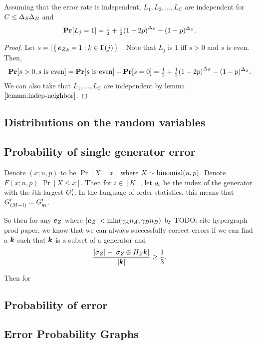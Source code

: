 \begin{lemma}{
	Assuming that the error rate is independent,
	$L_1, L_2, ..., L_C$ are independent for $C \leq {\Delta_{S}} {\Delta_{B}}$ and
	$$
		\Pr[L_j = 1] = \PrL.
	$$
}
\begin{proof}
	Let $s = |\set{{\boldsymbol{e}_Z}_k = 1 : k \in \Gamma(j)}|$.
	Note that $L_j$ is $1$ iff $s > 0$ and $s$ is even.
	Then,
	$$
		\Pr[s > 0, s \text{ is even}] = \Pr[s\text{ is even}] - \Pr[s = 0] = \PrL.
	$$
	We can also take that $L_1, ..., L_C$ are independent by lemma $\ref{lemma:indep-neighbor}$.
\end{proof}
\end{lemma}


\subsection*{Distributions on the random variables}

\subsection*{Probability of single generator error}
Denote $(x; n, p)$ to be $\Pr[X = x]$ where $X \sim \operatorname{binomial}(n, p)$. Denote $F(x; n, p)$ $\Pr[X \leq x]$.
Then for $i \in [K]$, let $g_i$ be the index of the generator with the $i$th largest ${G'_i}$.
In the language of order statistics, this means that ${G'_{(M - i)}} = {G'_{g_i}}$.

So then for any ${\boldsymbol{e}_Z}$ where $|{\boldsymbol{e}_Z}| < \min(\gamma_An_A, \gamma_Bn_B)$ by TODO: cite hypergraph prod paper, we know that we can always successfully
correct errors if we can find a $\boldsymbol{\boldsymbol{k}}$ such that $\boldsymbol{\boldsymbol{k}}$ is a subset of a generator and
$$
	\frac{|\sigma_Z| - |\sigma_Z \oplus H_Z\boldsymbol{\boldsymbol{k}}|}{|\boldsymbol{\boldsymbol{k}}|}	\geq \frac{1}{3}.
$$


Then for 

\subsection*{Probability of error}

\subsection*{Error Probability Graphs}


